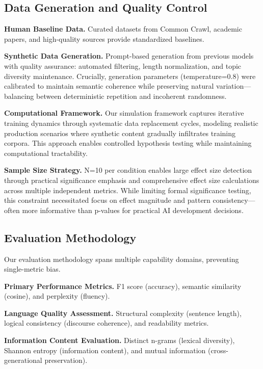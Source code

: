 \documentclass{article}
\begin{document}
\subsection{Data Generation and Quality Control}

\textbf{Human Baseline Data.} Curated datasets from Common Crawl, academic papers, and high-quality sources provide standardized baselines.

\textbf{Synthetic Data Generation.} Prompt-based generation from previous models with quality assurance: automated filtering, length normalization, and topic diversity maintenance. Crucially, generation parameters (temperature=0.8) were calibrated to maintain semantic coherence while preserving natural variation—balancing between deterministic repetition and incoherent randomness.

\textbf{Computational Framework.} Our simulation framework captures iterative training dynamics through systematic data replacement cycles, modeling realistic production scenarios where synthetic content gradually infiltrates training corpora. This approach enables controlled hypothesis testing while maintaining computational tractability.

\textbf{Sample Size Strategy.} N=10 per condition enables large effect size detection through practical significance emphasis and comprehensive effect size calculations across multiple independent metrics. While limiting formal significance testing, this constraint necessitated focus on effect magnitude and pattern consistency—often more informative than p-values for practical AI development decisions.

\subsection{Evaluation Methodology}

Our evaluation methodology spans multiple capability domains, preventing single-metric bias.

\textbf{Primary Performance Metrics.} F1 score (accuracy), semantic similarity (cosine), and perplexity (fluency).

\textbf{Language Quality Assessment.} Structural complexity (sentence length), logical consistency (discourse coherence), and readability metrics.

\textbf{Information Content Evaluation.} Distinct n-grams (lexical diversity), Shannon entropy (information content), and mutual information (cross-generational preservation).
\end{document}
